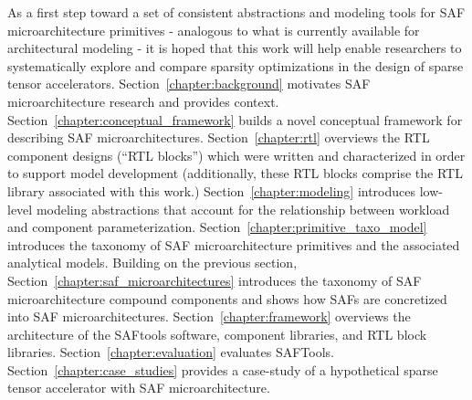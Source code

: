 As a first step toward a set of consistent abstractions and modeling tools for SAF microarchitecture primitives - analogous to what is currently available for architectural modeling - it is hoped that this work will help enable researchers to systematically explore and compare sparsity optimizations in the design of sparse tensor accelerators. Section~\ref{chapter:background} motivates SAF microarchitecture research and provides context. Section~\ref{chapter:conceptual_framework} builds a novel conceptual framework for describing SAF microarchitectures. Section~\ref{chapter:rtl} overviews the RTL component designs (``RTL blocks'') which were written and characterized in order to support model development (additionally, these RTL blocks comprise the RTL library associated with this work.) Section~\ref{chapter:modeling} introduces low-level modeling abstractions that account for the relationship between workload and component parameterization. Section~\ref{chapter:primitive_taxo_model} introduces the taxonomy of SAF microarchitecture primitives and the associated analytical models. Building on the previous section, Section~\ref{chapter:saf_microarchitectures} introduces the taxonomy of SAF microarchitecture compound components and shows how SAFs are concretized into SAF microarchitectures. Section~\ref{chapter:framework} overviews the architecture of the SAFtools software, component libraries, and RTL block libraries. Section~\ref{chapter:evaluation} evaluates SAFTools. Section~\ref{chapter:case_studies} provides a case-study of a hypothetical sparse tensor accelerator with SAF microarchitecture.

